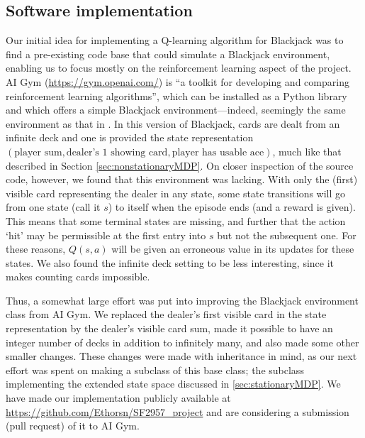 \subsection{Software implementation} \label{sec:software}
Our initial idea for implementing a Q-learning algorithm for Blackjack was to find a pre-existing code base that
could simulate a Blackjack environment, enabling us to focus mostly on the reinforcement learning aspect of
the project. AI Gym (\url{https://gym.openai.com/}) is ``a toolkit for developing and comparing reinforcement learning 
algorithms'', which can be installed as a Python library and which offers a simple Blackjack environment---indeed,
seemingly the same environment as that in \citet{Sutton2018}. In this version of Blackjack, cards are dealt from
an infinite deck and one is provided the state representation 
$(\text{player sum},\text{dealer's 1 showing card}, \text{player has usable ace})$, much like that described
in Section \ref{sec:nonstationaryMDP}. On closer inspection of the source code, however, we found that this
environment was lacking.
With only the (first) visible card representing the dealer in any state, some state transitions will go 
from one state (call it $s$) to itself when the episode ends (and a reward is given). This means that some terminal
states are missing, and further that the action `hit' may be permissible at the first entry into $s$ but not
the subsequent one. For these reasons, $Q(s,a)$ will be given an erroneous value in its updates for these states. 
We also found the infinite deck setting to be less interesting, 
since it makes counting cards impossible.

Thus, a somewhat large effort was put into improving the Blackjack environment class from AI Gym. We replaced the
dealer's first visible card in the state representation by the dealer's visible card sum, made it possible to
have an integer number of decks in addition to infinitely many, and also made some other smaller changes.
These changes were made with inheritance in mind, as our next effort was spent on making a subclass of this
base class; the subclass implementing the extended state space discussed in \ref{sec:stationaryMDP}.
We have made our implementation publicly available at \url{https://github.com/Ethorsn/SF2957_project} and
are considering a submission (pull request) of it to AI Gym. 